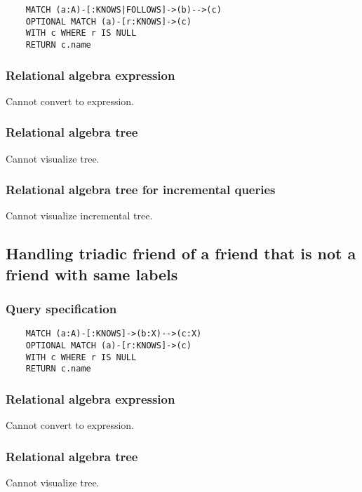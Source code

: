 	\begin{lstlisting}
	MATCH (a:A)-[:KNOWS|FOLLOWS]->(b)-->(c)
	OPTIONAL MATCH (a)-[r:KNOWS]->(c)
	WITH c WHERE r IS NULL
	RETURN c.name
	\end{lstlisting}


	\subsubsection*{Relational algebra expression}

	Cannot convert to expression.

	\subsubsection*{Relational algebra tree}

	Cannot visualize tree.

	\subsubsection*{Relational algebra tree for incremental queries}

	Cannot visualize incremental tree.
	\subsection{Handling triadic friend of a friend that is not a friend with same labels}

	\subsubsection*{Query specification}

	\begin{lstlisting}
	MATCH (a:A)-[:KNOWS]->(b:X)-->(c:X)
	OPTIONAL MATCH (a)-[r:KNOWS]->(c)
	WITH c WHERE r IS NULL
	RETURN c.name
	\end{lstlisting}


	\subsubsection*{Relational algebra expression}

	Cannot convert to expression.

	\subsubsection*{Relational algebra tree}

	Cannot visualize tree.

